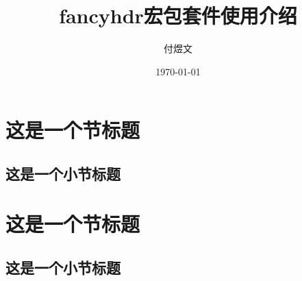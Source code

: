 \documentclass[]{ctexart}
\title{fancyhdr宏包套件使用介绍}
\author{付煜文}
\date{\today}
\begin{document}
	\maketitle
	
	\newpage
	\section{这是一个节标题}
	\lipsum[1]
	\subsection{这是一个小节标题}
	\lipsum[2]
	\newpage
	\section{这是一个节标题}
	\lipsum[3]
	\subsection{这是一个小节标题}
	\lipsum[4]
\end{document}
